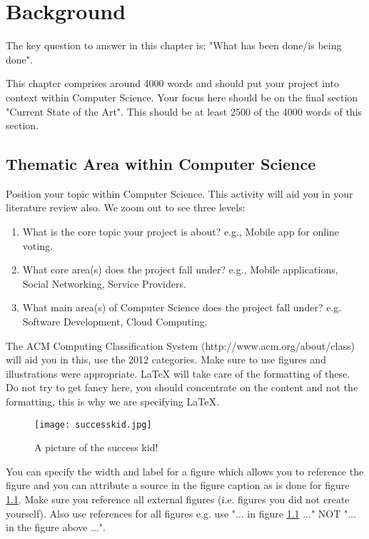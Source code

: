 \chapter{Background}
\label{chap:background}
The key question to answer in this chapter is: "What has been done/is being done". 

This chapter comprises around 4000 words and should put your project into context within Computer Science. Your focus here should be on the final section "Current State of the Art". This should be at least 2500 of the 4000 words of this section.

\section{Thematic Area within Computer Science}
Position your topic within Computer Science. This activity will aid you in your literature review also. We zoom out to see three levels:

\begin{enumerate}
    \item What is the core topic your project is about? e.g., Mobile app for online voting.
    \item What core area(s) does the project fall under? e.g., Mobile applications, Social Networking, Service Providers. 
    \item What main area(s) of Computer Science does the project fall under? e.g. Software Development, Cloud Computing.
\end{enumerate}

The ACM Computing Classification System (http://www.acm.org/about/class) will aid you in this, use the 2012 categories. Make sure to use figures and illustrations were appropriate. LaTeX will take care of the formatting of these. Do not try to get fancy here, you should concentrate on the content and not the formatting, this is why we are specifying LaTeX.

\begin{figure}[ht]
  \centering
      \texttt{[image: successkid.jpg]}
  \caption[A picture of the success kid!]{A picture of the success kid!\cite{Reference1}}
  \label{fig:successkid}
\end{figure}

You can specify the width and label for a figure which allows you to reference the figure and you can attribute a source in the figure caption as is done for figure \ref{fig:successkid}. Make sure you reference all external figures (i.e. figures you did not create yourself). Also use references for all figures e.g. use "... in figure \ref{fig:successkid} ..." NOT "... in the figure above ...".

